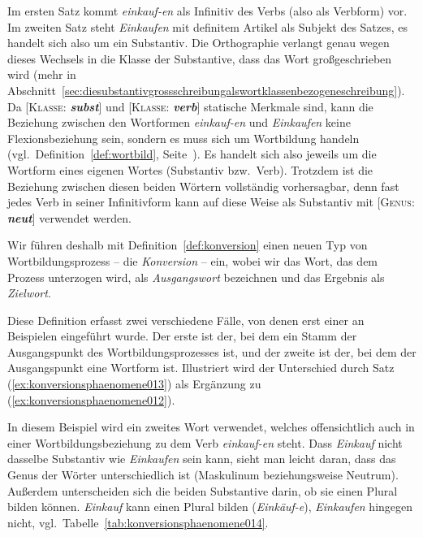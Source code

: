 Im ersten Satz kommt \textit{einkauf-en} als Infinitiv des Verbs (also als Verbform) vor.
Im zweiten Satz steht \textit{Einkaufen} mit definitem Artikel als Subjekt des Satzes, es handelt sich also um ein Substantiv.
Die Orthographie verlangt genau wegen dieses Wechsels in die Klasse der Substantive, dass das Wort großgeschrieben wird (mehr in Abschnitt~\ref{sec:diesubstantivgrossschreibungalswortklassenbezogeneschreibung}).
Da [\textsc{Klasse}: \textit{\textbf{subst}}] und [\textsc{Klasse}: \textit{\textbf{verb}}] statische Merkmale sind, kann die Beziehung zwischen den Wortformen \textit{einkauf-en} und \textit{Einkaufen} keine Flexionsbeziehung sein, sondern es muss sich um Wortbildung handeln (vgl.\ Definition~\ref{def:wortbild}, Seite~\pageref{def:wortbild}).
Es handelt sich also jeweils um die Wortform eines eigenen Wortes (Substantiv bzw.\ Verb).
Trotzdem ist die Beziehung zwischen diesen beiden Wörtern vollständig vorhersagbar, denn fast jedes Verb in seiner Infinitivform kann auf diese Weise als Substantiv mit [\textsc{Genus}: \textit{\textbf{neut}}] verwendet werden.

Wir führen deshalb mit Definition~\ref{def:konversion} einen neuen Typ von Wortbildungsprozess -- die \textit{Konversion} -- ein, wobei wir das Wort, das dem Prozess unterzogen wird, als \textit{Ausgangswort} bezeichnen und das Ergebnis als \textit{Zielwort}.


Diese Definition erfasst zwei verschiedene Fälle, von denen erst einer an Beispielen eingeführt wurde.
Der erste ist der, bei dem ein Stamm der Ausgangspunkt des Wortbildungsprozesses ist, und der zweite ist der, bei dem der Ausgangspunkt eine Wortform ist.
Illustriert wird der Unterschied durch Satz (\ref{ex:konversionsphaenomene013}) als Ergänzung zu (\ref{ex:konversionsphaenomene012}).

\begin{exe}
\end{exe}

In diesem Beispiel wird ein zweites Wort verwendet, welches offensichtlich auch in einer Wortbildungsbeziehung zu dem Verb \textit{einkauf-en} steht.
Dass \textit{Einkauf} nicht dasselbe Substantiv wie \textit{Einkaufen} sein kann, sieht man leicht daran, dass das Genus der Wörter unterschiedlich ist (Maskulinum beziehungsweise Neutrum).
Außerdem unterscheiden sich die beiden Substantive darin, ob sie einen Plural bilden können.
\textit{Einkauf} kann einen Plural bilden (\textit{Einkäuf-e}), \textit{Einkaufen} hingegen nicht, vgl.\ Tabelle~\ref{tab:konversionsphaenomene014}.

